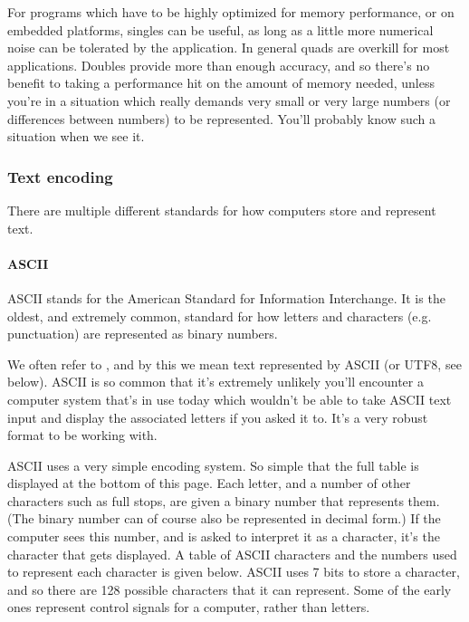 \documentclass[letterpaper,10pt,british]{sphinxmanual}
\begin{document}
\sphinxAtStartPar
For programs which have to be highly optimized for memory performance, or on embedded platforms, singles can be useful, as long as a little more numerical noise can be tolerated by the application. In general quads are overkill for most applications. Doubles provide more than enough accuracy, and so there’s no benefit to taking a performance hit on the amount of memory needed, unless you’re in a situation which really demands very small or very large numbers (or differences between numbers) to be represented. You’ll probably know such a situation when we see it.

\sphinxstepscope


\subsubsection{Text encoding}
\label{\detokenize{chapters/programming_fundamentals/text_encoding:text-encoding}}\label{\detokenize{chapters/programming_fundamentals/text_encoding:id1}}\label{\detokenize{chapters/programming_fundamentals/text_encoding::doc}}
\sphinxAtStartPar
There are multiple different standards for how computers store and represent text.


\paragraph{ASCII}
\label{\detokenize{chapters/programming_fundamentals/text_encoding:ascii}}\label{\detokenize{chapters/programming_fundamentals/text_encoding:id2}}
\sphinxAtStartPar
ASCII stands for the American Standard for Information Interchange. It is the oldest, and extremely common, standard for how letters and characters (e.g. punctuation) are represented as binary numbers.

\sphinxAtStartPar
We often refer to , and by this we mean text represented by ASCII (or UTF\sphinxhyphen{}8, see below). ASCII is so common that it’s extremely unlikely you’ll encounter a computer system that’s in use today which wouldn’t be able to take ASCII text input and display the associated letters if you asked it to. It’s a very robust format to be working with.

\sphinxAtStartPar
ASCII uses a very simple encoding system. So simple that the full table is displayed at the bottom of this page. Each letter, and a number of other characters such as full stops, are given a binary number that represents them. (The binary number can of course also be represented in decimal form.) If the computer sees this number, and is asked to interpret it as a character, it’s the character that gets displayed. A table of ASCII characters and the numbers used to represent each character is given below. ASCII uses 7 bits to store a character, and so there are 128 possible characters that it can represent. Some of the early ones represent control signals for a computer, rather than letters.
\end{document}
